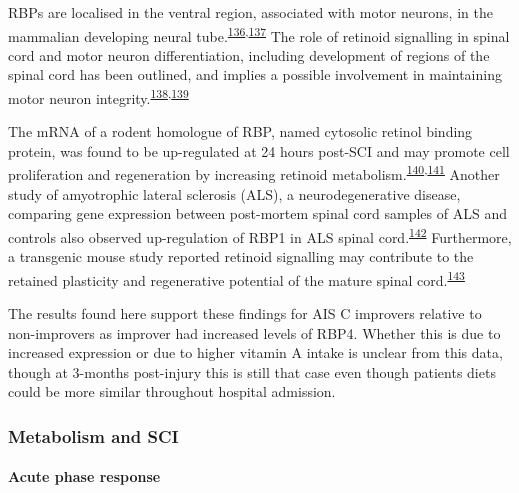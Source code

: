 \documentclass[
]{article}
\begin{document}
RBPs are localised in the ventral region, associated with motor neurons, in the mammalian developing neural tube.\textsuperscript{\protect\hyperlink{ref-pierani_sonic_1999}{136},\protect\hyperlink{ref-maden_retinoid-binding_1990}{137}}
The role of retinoid signalling in spinal cord and motor neuron differentiation, including development of regions of the spinal cord has been outlined, and implies a possible involvement in maintaining motor neuron integrity.\textsuperscript{\protect\hyperlink{ref-colbert_retinoid_1995}{138},\protect\hyperlink{ref-sockanathan_motor_1998}{139}}

The mRNA of a rodent homologue of RBP, named cytosolic retinol binding protein, was found to be up-regulated at 24 hours post-SCI and may promote cell proliferation and regeneration by increasing retinoid metabolism.\textsuperscript{\protect\hyperlink{ref-song_genechip_2001}{140},\protect\hyperlink{ref-hurst_complexity_1999}{141}}
Another study of amyotrophic lateral sclerosis (ALS), a neurodegenerative disease, comparing gene expression between post-mortem spinal cord samples of ALS and controls also observed up-regulation of RBP1 in ALS spinal cord.\textsuperscript{\protect\hyperlink{ref-malaspina_differential_2001}{142}}
Furthermore, a transgenic mouse study reported retinoid signalling may contribute to the retained plasticity and regenerative potential of the mature spinal cord.\textsuperscript{\protect\hyperlink{ref-haskell_retinoic_2002}{143}}

The results found here support these findings for AIS C improvers relative to non-improvers as improver had increased levels of RBP4.
Whether this is due to increased expression or due to higher vitamin A intake is unclear from this data, though at 3-months post-injury this is still that case even though patients diets could be more similar throughout hospital admission.

\hypertarget{metabolism-and-sci}{%
\subsubsection{Metabolism and SCI}\label{metabolism-and-sci}}

\hypertarget{acute-phase-response}{%
\paragraph{Acute phase response}\label{acute-phase-response}}
\end{document}
